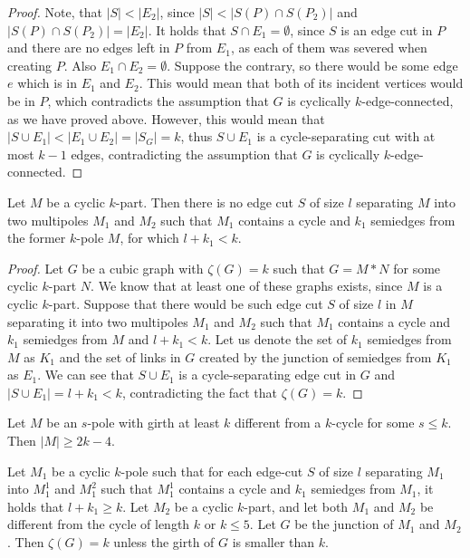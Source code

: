 \documentclass[12pt, twoside]{book}
\begin{document}
\begin{proof}
	Note, that $|S| < |E_2|$, since $|S| < |S(P)\cap S(P_2)|$ and $|S(P)\cap S(P_2)|=|E_2|$. It holds that $S\cap E_1=\emptyset$, since $S$ is an edge cut in $P$ and there are no edges left in $P$ from $E_1$, as each of them was severed when creating $P$. Also $E_1\cap E_2=\emptyset$. Suppose the contrary, so there would be some edge $e$ which is in $E_1$ and $E_2$. This would mean that both of its incident vertices would be in $P$, which contradicts the assumption that $G$ is cyclically $k$-edge-connected, as we have proved above. However, this would mean that $|S\cup E_1|< |E_1\cup E_2| = |S_G|=k$, thus $S\cup E_1$ is a cycle-separating cut with at most $k-1$ edges, contradicting the assumption that $G$ is cyclically $k$-edge-connected.
	
\end{proof}

\begin{lemma}
	Let $M$ be a cyclic $k$-part. Then there is no edge cut $S$ of size $l$ separating $M$ into two multipoles $M_1$ and $M_2$ such that $M_1$ contains a cycle and $k_1$ semiedges from the former $k$-pole $M$, for which $l+k_1 < k$.
\end{lemma}

\begin{proof}
	Let $G$ be a cubic graph with $\zeta(G)=k$ such that $G=M*N$ for some cyclic $k$-part $N$. We know that at least one of these graphs exists, since $M$ is a cyclic $k$-part. Suppose that there would be such edge cut $S$ of size $l$ in $M$ separating it into two multipoles $M_1$ and $M_2$ such that $M_1$ contains a cycle and $k_1$ semiedges from $M$ and $l+k_1 < k$. Let us denote the set of $k_1$ semiedges from $M$ as $K_1$ and the set of links in $G$ created by the junction of semiedges from $K_1$ as $E_1$. We can see that $S\cup E_1$ is a cycle-separating edge cut in $G$ and $|S\cup E_1|=l+k_1 < k$, contradicting the fact that $\zeta(G)=k$.
\end{proof}

\begin{lemma}\label{lem:rajnik5.1}
	Let $M$ be an $s$-pole with girth at least $k$ different from a $k$-cycle for some $s\leq k$. Then $|M| \geq 2k - 4$.
\end{lemma}

\begin{theorem}
	Let $M_1$ be a cyclic $k$-pole such that for each edge-cut $S$ of size $l$ separating $M_1$ into $M_1^1$ and $M_1^2$ such that $M_1^1$ contains a cycle and $k_1$ semiedges from $M_1$, it holds that $l+k_1\geq k$. Let $M_2$ be a cyclic $k$-part, and let both $M_1$ and $M_2$ be different from the cycle of length $k$ or $k\leq 5$. Let $G$ be the junction of $M_1$ and $M_2$. Then $\zeta(G)=k$ unless the girth of $G$ is smaller than $k$.
\end{theorem}
\end{document}
